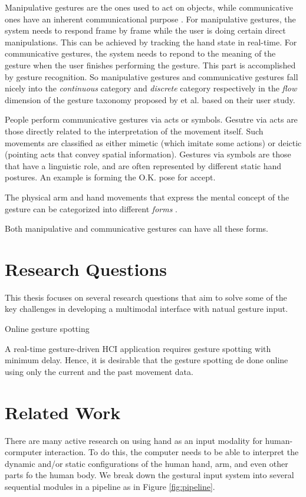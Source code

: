 Manipulative gestures are the ones used to act on objects, while communicative 
ones have an inherent communicational purpose \cite{Pavlovic97}. For
manipulative gestures, the system needs to respond frame by frame while the user is doing
certain direct manipulations. This can be achieved by tracking the hand
state in real-time. For communicative gestures, the system needs to repond to
the meaning of the gesture when the user finishes performing the gesture. This part is
accomplished by gesture recognition. So manipulative gestures and communicative
gestures fall nicely into the \textit{continuous} category and
\textit{discrete} category respectively in the \textit{flow} dimension of the
gesture taxonomy proposed by \cite{wobbrock09} et al. based on their user study.

People perform communicative gestures via acts or symbols. Gesutre via acts are
those directly related to the interpretation of the movement itself. Such
movements are classified as either mimetic (which imitate some actions) or
deictic (pointing acts that convey spatial information). Gestures via symbols
are those that have a linguistic role, and are often represented by different static hand postures. An example is forming the
O.K. pose for accept. 

The physical arm and hand movements that express the mental concept of the
gesture can be categorized into different \textit{forms} \cite{wobbrock09}. 

\begin{table}

\end{table}

Both manipulative and communicative gestures can have all these forms.

\section{Research Questions}
This thesis focuses on several research questions that aim to solve some of the
key challenges in developing a multimodal interface with natual gesture input.

Online gesture spotting

A real-time gesture-driven HCI application requires gesture spotting with
minimum delay. Hence, it is desirable that the gesture spotting de done online
using only the current and the past movement data.

\section{Related Work}
There are many active research on using hand as an input modality for
human-cormputer interaction. To do this, the computer needs to be able to
interpret the dynamic and/or static configurations of the human hand, arm, and
even other parts fo the human body. We break down the gestural input
system into several sequential modules in a pipeline as in Figure
\ref{fig:pipeline}.

